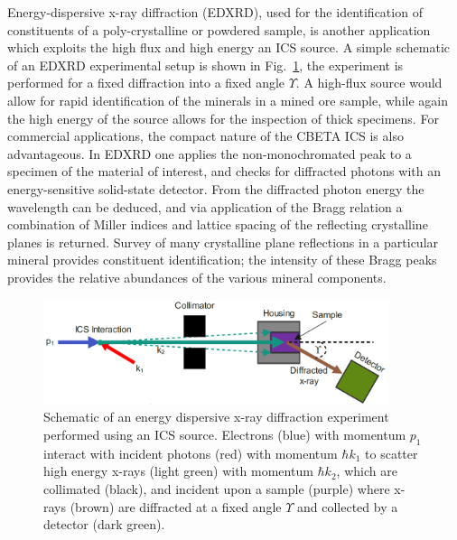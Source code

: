 \documentclass[../main.tex]{subfiles}
\begin{document}
Energy-dispersive x-ray diffraction (EDXRD), used for the identification of constituents of a poly-crystalline or powdered sample, is another application which exploits the high flux and high energy an ICS source. A simple schematic of an EDXRD experimental setup is shown in Fig.~\ref{fig:EDXRD_diagram}, the experiment is performed for a fixed diffraction into a fixed angle $\Upsilon$. A high-flux source would allow for rapid identification of the minerals in a mined ore sample, while again the high energy of the source allows for the inspection of thick specimens. For commercial applications, the compact nature of the CBETA ICS is also advantageous. In EDXRD \cite{kampfe2005energy} one applies the non-monochromated peak to a specimen of the material of interest, and checks for diffracted photons with an energy-sensitive solid-state detector. From the diffracted photon energy the wavelength can be deduced, and via application of the Bragg relation a combination of Miller indices and lattice spacing of the reflecting crystalline planes is returned. Survey of many crystalline plane reflections in a particular mineral provides constituent identification; the intensity of these Bragg peaks provides the relative abundances of the various mineral components. 
\begin{figure}[!h]
\centering
\includegraphics[width=0.9\textwidth]{Figures/CBETA_Inverse_Compton_Source_Design/EDXRD_diagram_fixed.pdf}
\caption{Schematic of an energy dispersive x-ray diffraction experiment performed using an ICS source. Electrons (blue) with momentum $p_{1}$ interact with incident photons (red) with momentum $\hbar k_{1}$ to scatter high energy x-rays (light green) with momentum $\hbar k_{2}$, which are collimated (black), and incident upon a sample (purple) where x-rays (brown) are diffracted at a fixed angle $\Upsilon$ and collected by a detector (dark green).}
\label{fig:EDXRD_diagram}    
\end{figure}
\end{document}
